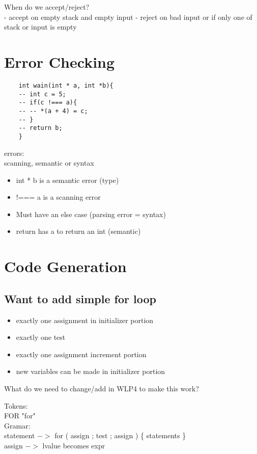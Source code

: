 \documentclass[12pt]{article}
\begin{document}
	When do we accept/reject? \\
	- accept on empty stack and empty input
	- reject on bad input or if only one of stack or input is empty
	
	\section*{Error Checking}
	\begin{verbatim}
	int wain(int * a, int *b){
	-- int c = 5;
	-- if(c !=== a){
	-- -- *(a + 4) = c;
	-- }
	-- return b;
	}
	\end{verbatim}
	errors:\\
	scanning, semantic or syntax\\
	\begin{itemize}
		\item int * b is a semantic error (type)
		\item !=== a is a scanning error
		\item Must have an else case (parsing error = syntax)
		\item return has a to return an int (semantic)
	\end{itemize}
	
	\section*{Code Generation}
	\subsection*{Want to add simple for loop}
		\begin{itemize}
			\item exactly one assignment in initializer portion
			\item exactly one test
			\item exactly one assignment increment portion
			\item new variables can be made in initializer portion
		\end{itemize}
	What do we need to change/add in WLP4 to make this work?
	
	Tokens:\\
	FOR "for"\\
	
	Gramar:\\
	statement $->$ for ( assign ; test ; assign ) \{ statements \}\\
	assign $->$ lvalue becomes expr\\
	
\end{document}
